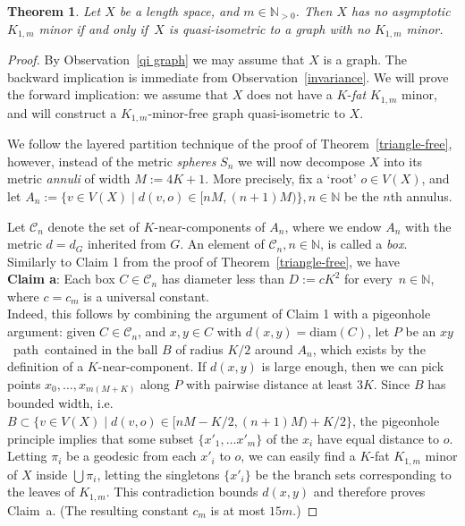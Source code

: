 \documentclass[a4paper]{article}
\newcommand{\defi}[1]{{\color{darkgray}\emph{#1}}}
\newtheorem{theorem}[proposition]{Theorem}
\newcommand{\N}{\ensuremath{\mathbb N}}
\newcommand{\cc}{\ensuremath{\mathcal C}}
\newcommand{\nin}{\ensuremath{{n\in\N}}}
\newcommand{\pth}[2]{\ensuremath{#1}\text{--}\ensuremath{#2}~path}
\newcommand{\Tr}[1]{Theorem~\ref{#1}}
\newcommand{\Or}[1]{Observation~\ref{#1}}
\renewcommand{\iff}{if and only if}
\newcommand{\fe}{for every}
\newcommand{\diam}{\mathrm{diam}}
\begin{document}
\begin{theorem} \label{thm star}
Let $X$ be a length space, and $m\in \N_{>0}$. Then $X$ has no asymptotic $K_{1,m}$ minor \iff\ $X$ is quasi-isometric to a graph with no $K_{1,m}$ minor.
\end{theorem}
\begin{proof}
By \Or{qi graph} we may assume that $X$ is a graph. The backward implication is immediate from \Or{invariance}. We will prove the forward implication: we assume that $X$ does not have a $K$-\defi{fat} $K_{1,m}$ minor, and will construct a $K_{1,m}$-minor-free graph quasi-isometric to $X$. 

\medskip
We follow the layered partition technique of the proof of \Tr{triangle-free}, however, instead of the metric \defi{spheres} $S_n$ we will now decompose $X$ into its metric \defi{annuli} of width $M:=4K+1$. More precisely, fix a `root' $o\in V(X)$, and let $A_n:= \{ v\in V(X) \mid d(v,o)\in [nM, (n+1)M) \}, n\in \N$ be the $n$th annulus.

Let $\cc_n$ denote the set of  $K$-near-components of $A_n$, where we endow $A_n$ with the metric $d=d_G$ inherited from $G$. An element of $\cc_n, \nin$, is called a \defi{box}. Similarly to {Claim 1} from the proof of \Tr{triangle-free}, we have\\

{\bf Claim a}: Each box $C\in \cc_n$ has diameter less than $D:= c K^2$ \fe\ $n\in \N$, where $c=c_m$ is a universal constant.\\

Indeed, this follows by combining the argument of {Claim 1} with a pigeonhole argument: given $C\in \cc_n$, and $x,y\in C$ with $d(x,y)= \diam(C)$, let $P$ be an \pth{x}{y}\ contained in the ball $B$ of radius $K/2$ around $A_n$, which exists by the definition of a $K$-near-component. If $d(x,y)$ is large enough, then we can pick points $x_0,\ldots, x_{m(M+K)}$ along $P$ with pairwise distance at least $3K$. Since $B$ has bounded width, i.e.\ $B\subset \{v\in V(X) \mid d(v,o)\in [nM-K/2, (n+1)M)+K/2 \}$, the pigeonhole principle implies that some subset $\{x'_1, \ldots x'_m\}$ of the $x_i$ have equal distance to $o$. Letting $\pi_i$ be a geodesic from each $x'_i$ to $o$, we can easily find a $K$-fat $K_{1,m}$ minor of $X$ inside $\bigcup \pi_i$, letting the singletons $\{x'_i\}$ be the branch sets corresponding to the leaves of  $K_{1,m}$. This contradiction bounds $d(x,y)$ and therefore proves Claim~a. (The resulting constant $c_m$ is at most $15m$.)
\medskip


\end{proof}
\end{document}
